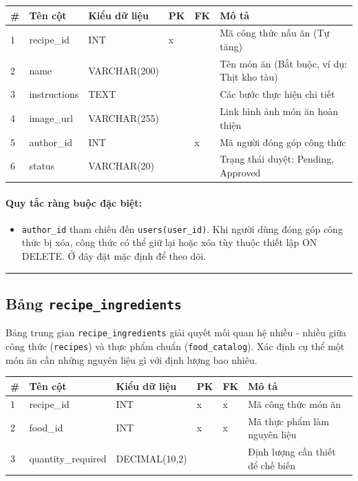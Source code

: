 \documentclass[12pt,a4paper]{article}
\begin{document}
\begin{longtable}{|p{0.5cm}|p{3.4cm}|p{3.2cm}|p{0.7cm}|p{0.7cm}|p{3.6cm}|}
\hline
\textbf{\#} & \textbf{Tên cột} & \textbf{Kiểu dữ liệu} & \textbf{PK} & \textbf{FK} & \textbf{Mô tả} \\ \hline
\endhead
1 & recipe\_id & INT & x & & Mã công thức nấu ăn (Tự tăng) \\ \hline
2 & name & VARCHAR(200) & & & Tên món ăn (Bắt buộc, ví dụ: Thịt kho tàu) \\ \hline
3 & instructions & TEXT & & & Các bước thực hiện chi tiết \\ \hline
4 & image\_url & VARCHAR(255) & & & Link hình ảnh món ăn hoàn thiện \\ \hline
5 & author\_id & INT & & x & Mã người đóng góp công thức \\ \hline
6 & status & VARCHAR(20) & & & Trạng thái duyệt: Pending, Approved \\ \hline
\end{longtable}

\paragraph{Quy tắc ràng buộc đặc biệt:}
\begin{itemize}
    \item \texttt{author\_id} tham chiếu đến \texttt{users(user\_id)}. Khi người dùng đóng góp công thức bị xóa, công thức có thể giữ lại hoặc xóa tùy thuộc thiết lập ON DELETE. Ở đây đặt mặc định để theo dõi.
\end{itemize}

\vskip 0.5cm
\noindent\rule{\textwidth}{0.5pt}
\vskip 0.5cm

\subsection{Bảng \texttt{recipe\_ingredients}}
Bảng trung gian \texttt{recipe\_ingredients} giải quyết mối quan hệ nhiều - nhiều giữa công thức (\texttt{recipes}) và thực phẩm chuẩn (\texttt{food\_catalog}). Xác định cụ thể một món ăn cần những nguyên liệu gì với định lượng bao nhiêu.

\begin{longtable}{|p{0.5cm}|p{3.4cm}|p{3.2cm}|p{0.7cm}|p{0.7cm}|p{3.6cm}|}
\hline
\textbf{\#} & \textbf{Tên cột} & \textbf{Kiểu dữ liệu} & \textbf{PK} & \textbf{FK} & \textbf{Mô tả} \\ \hline
\endhead
1 & recipe\_id & INT & x & x & Mã công thức món ăn \\ \hline
2 & food\_id & INT & x & x & Mã thực phẩm làm nguyên liệu \\ \hline
3 & quantity\_required & DECIMAL(10,2) & & & Định lượng cần thiết để chế biến \\ \hline
\end{longtable}
\end{document}
